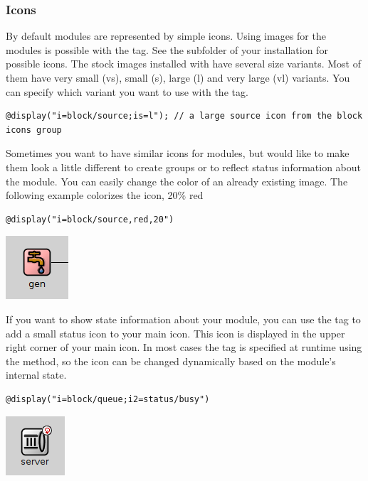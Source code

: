 \subsubsection{Icons}
By default modules are represented by simple icons.
Using images for the modules is possible with the  tag.
See the  subfolder of your {\opp} installation for possible
icons. The stock images installed with {\opp} have several size variants.
Most of them have very small (vs), small (s), large (l) and
very large (vl) variants. You can specify which variant you want to use with
the  tag.
\begin{verbatim}
@display("i=block/source;is=l"); // a large source icon from the block icons group
\end{verbatim}

Sometimes you want to have similar icons for modules, but would like to
make them look a little different to create groups or to reflect status
information about the module. You can easily change the color of an already existing image.
The following example colorizes the  icon, 20\% red
\begin{verbatim}
@display("i=block/source,red,20")
\end{verbatim}

\begin{center}
\includegraphics{figures/graphics-itag}
\end{center}

If you want to show state information about your module, you can use the  tag to
add a small status icon to your main icon. This icon is displayed in the upper right corner
of your main icon. In most cases the  tag is specified at runtime using
the  method, so the icon can be changed dynamically based on the
module's internal state.
\begin{verbatim}
@display("i=block/queue;i2=status/busy")
\end{verbatim}

\begin{center}
\includegraphics{figures/graphics-i2tag}
\end{center}

